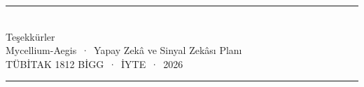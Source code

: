 \documentclass[aspectratio=169,11pt]{beamer}
\begin{document}
{%
\begin{frame}[plain]
  \vfill
  \centering
  {\color{aegisLeaf}\rule{3cm}{2pt}}\\[0.8em]
  {\color{aegisDark} Teşekkürler}\\[0.5em]
  {\color{aegisInk} Mycellium-Aegis \,·\, Yapay Zekâ ve Sinyal Zekâsı Planı}\\[0.3em]
  {\footnotesize\color{aegisLeaf} TÜBİTAK 1812 BİGG \,·\, İYTE \,·\, 2026}\\[0.8em]
  {\color{aegisLeaf}\rule{3cm}{2pt}}
  \vfill
\end{frame}
}
\end{document}
